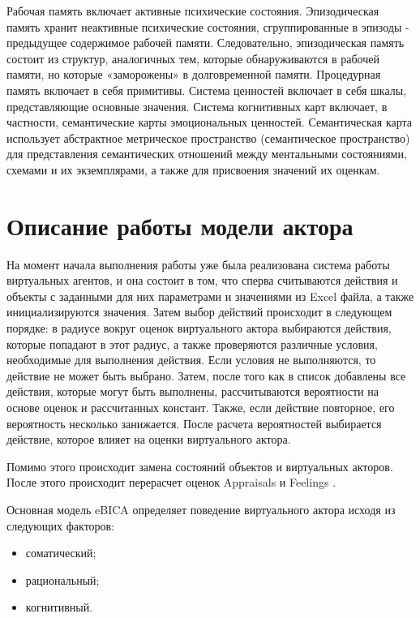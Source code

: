 Рабочая память включает активные психические состояния. Эпизодическая память хранит неактивные психические состояния, сгруппированные 
в эпизоды - предыдущее содержимое рабочей памяти. Следовательно, эпизодическая память состоит из структур, аналогичных тем, которые 
обнаруживаются в рабочей памяти, но которые «заморожены» в долговременной памяти. Процедурная память включает в себя примитивы. Система 
ценностей включает в себя шкалы, представляющие основные значения. Система когнитивных карт включает, в частности, семантические карты 
эмоциональных ценностей. Семантическая карта использует абстрактное метрическое пространство (семантическое пространство) для представления 
семантических отношений между ментальными состояниями, схемами и их экземплярами, а также для присвоения значений их оценкам.


\section{Описание работы модели актора}

На момент начала выполнения работы уже была реализована система работы виртуальных агентов, и она состоит в том, что сперва 
считываются действия и объекты с заданными для них параметрами и значениями из Excel файла, а также инициализируются значения. 
Затем выбор действий происходит в следующем порядке: в радиусе вокруг оценок виртуального актора выбираются действия, которые 
попадают в этот радиус, а также проверяются различные условия, необходимые для выполнения действия. Если условия не выполняются, 
то действие не может быть выбрано. Затем, после того как в список добавлены все действия, которые могут быть выполнены, рассчитываются 
вероятности на основе оценок и рассчитанных констант. Также, если действие повторное, его вероятность несколько занижается. 
После расчета вероятностей выбирается действие, которое влияет на оценки виртуального актора. 

Помимо этого происходит замена состояний объектов и виртуальных акторов. После этого происходит перерасчет оценок Appraisals и Feelings \cite{Samsonovich01}.

Основная модель eBICA определяет поведение виртуального актора исходя из следующих факторов:

\begin{itemize}
  \item соматический;
  \item рациональный;
  \item когнитивный.
\end{itemize}

